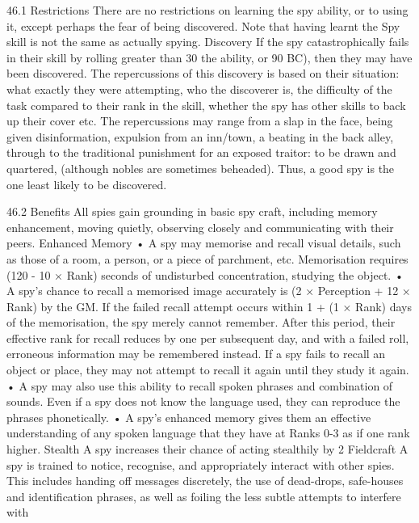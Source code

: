 \documentclass[a4paper]{article}
\begin{document}
\begin{multicols}{3}
46.1 Restrictions
There are no restrictions on learning the spy ability, or to using it, except perhaps the fear of being
discovered. Note that having learnt the Spy skill is
not the same as actually spying.
Discovery
If the spy catastrophically fails in their skill by
rolling greater than 30%
the ability, or 90%
BC), then they may have been discovered. The
repercussions of this discovery is based on their
situation: what exactly they were attempting, who
the discoverer is, the difficulty of the task compared to their rank in the skill, whether the spy has
other skills to back up their cover etc. The repercussions may range from a slap in the face, being
given disinformation, expulsion from an inn/town,
a beating in the back alley, through to the traditional punishment for an exposed traitor: to be
drawn and quartered, (although nobles are sometimes beheaded). Thus, a good spy is the one least
likely to be discovered.

46.2 Benefits
All spies gain grounding in basic spy craft, including memory enhancement, moving quietly, observing closely and communicating with their peers.
Enhanced Memory
• A spy may memorise and recall visual details,
such as those of a room, a person, or a piece of
parchment, etc. Memorisation requires (120 - 10 ×
Rank) seconds of undisturbed concentration, studying the object.
• A spy’s chance to recall a memorised image
accurately is (2 × Perception + 12 × Rank)%
by the GM. If the failed recall attempt occurs
within 1 + (1 × Rank) days of the memorisation,
the spy merely cannot remember. After this period,
their effective rank for recall reduces by one per
subsequent day, and with a failed roll, erroneous
information may be remembered instead. If a spy
fails to recall an object or place, they may not
attempt to recall it again until they study it again.
• A spy may also use this ability to recall spoken
phrases and combination of sounds. Even if a spy
does not know the language used, they can reproduce the phrases phonetically.
• A spy’s enhanced memory gives them an effective understanding of any spoken language that
they have at Ranks 0-3 as if one rank higher.
Stealth
A spy increases their chance of acting stealthily by
2%
Fieldcraft
A spy is trained to notice, recognise, and appropriately interact with other spies. This includes handing off messages discretely, the use of dead-drops,
safe-houses and identification phrases, as well as
foiling the less subtle attempts to interfere with


\end{multicols}
\end{document}
